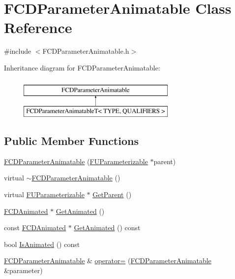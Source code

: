 \hypertarget{classFCDParameterAnimatable}{
\section{FCDParameterAnimatable Class Reference}
\label{classFCDParameterAnimatable}
}


{\ttfamily \#include $<$FCDParameterAnimatable.h$>$}

Inheritance diagram for FCDParameterAnimatable:\begin{figure}[H]
\begin{center}
\leavevmode
\includegraphics[height=2.000000cm]{classFCDParameterAnimatable}
\end{center}
\end{figure}
\subsection*{Public Member Functions}
\begin{DoxyCompactItemize}
\item 
\hyperlink{classFCDParameterAnimatable_aed03664bfbe151e2d4e86a34e333a55a}{FCDParameterAnimatable} (\hyperlink{classFUParameterizable}{FUParameterizable} $\ast$parent)
\item 
virtual \hyperlink{classFCDParameterAnimatable_a8a8895736c480eadd2f7fc894e92f5aa}{$\sim$FCDParameterAnimatable} ()
\item 
virtual \hyperlink{classFUParameterizable}{FUParameterizable} $\ast$ \hyperlink{classFCDParameterAnimatable_a91d43f004a0e43c11e22020e95cfc559}{GetParent} ()
\item 
\hyperlink{classFCDAnimated}{FCDAnimated} $\ast$ \hyperlink{classFCDParameterAnimatable_a1eb6abbad4614e5e4cf5933e9880edf8}{GetAnimated} ()
\item 
const \hyperlink{classFCDAnimated}{FCDAnimated} $\ast$ \hyperlink{classFCDParameterAnimatable_a42cbf84436c006ee466483b911425bf4}{GetAnimated} () const 
\item 
bool \hyperlink{classFCDParameterAnimatable_ac66b59ea020fcde7c54c5a4d8c0e8a42}{IsAnimated} () const 
\item 
\hyperlink{classFCDParameterAnimatable}{FCDParameterAnimatable} \& \hyperlink{classFCDParameterAnimatable_a70b165dd59cd82b6e431ae32113286f8}{operator=} (\hyperlink{classFCDParameterAnimatable}{FCDParameterAnimatable} \&parameter)
\end{DoxyCompactItemize}

